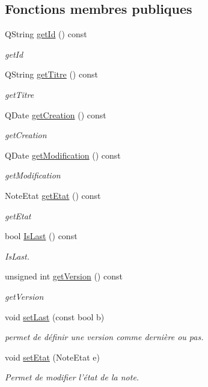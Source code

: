 \subsection*{Fonctions membres publiques}
\begin{DoxyCompactItemize}
\item 
Q\-String \hyperlink{class_note_a880a9b4330b29c7264e87a346d712ebc}{get\-Id} () const 
\begin{DoxyCompactList}\small\item\em get\-Id \end{DoxyCompactList}\item 
Q\-String \hyperlink{class_note_ad4e78b2146a88e8b5a253b9eeb496936}{get\-Titre} () const 
\begin{DoxyCompactList}\small\item\em get\-Titre \end{DoxyCompactList}\item 
Q\-Date \hyperlink{class_note_a23a61ddfcb6a5726cf43a40fb88d16aa}{get\-Creation} () const 
\begin{DoxyCompactList}\small\item\em get\-Creation \end{DoxyCompactList}\item 
Q\-Date \hyperlink{class_note_a3ff7b051ab009bf412b1c9ff99a62b27}{get\-Modification} () const 
\begin{DoxyCompactList}\small\item\em get\-Modification \end{DoxyCompactList}\item 
Note\-Etat \hyperlink{class_note_a55cd34f072d21f3b2f69133b2b6c5bf2}{get\-Etat} () const 
\begin{DoxyCompactList}\small\item\em get\-Etat \end{DoxyCompactList}\item 
bool \hyperlink{class_note_a55db384b5684c5d8dc6795424eda1d1a}{Is\-Last} () const 
\begin{DoxyCompactList}\small\item\em Is\-Last. \end{DoxyCompactList}\item 
unsigned int \hyperlink{class_note_a5a9830e6d44f86962ea54ee94480aa17}{get\-Version} () const 
\begin{DoxyCompactList}\small\item\em get\-Version \end{DoxyCompactList}\item 
void \hyperlink{class_note_acba9b05c587ff6a660a9b5c46614acf3}{set\-Last} (const bool b)
\begin{DoxyCompactList}\small\item\em permet de définir une version comme dernière ou pas. \end{DoxyCompactList}\item 
void \hyperlink{class_note_af4f439239e2f2dcdc9fb0abdac2bd67a}{set\-Etat} (Note\-Etat e)
\begin{DoxyCompactList}\small\item\em Permet de modifier l'état de la note. \end{DoxyCompactList}\end{DoxyCompactItemize}
